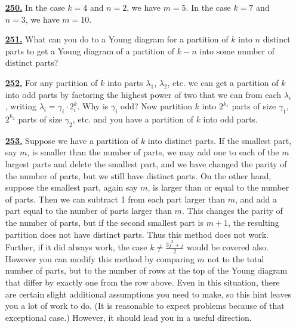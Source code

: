 \documentclass[10pt,]{book}
\theoremstyle{plain}
\theoremstyle{definition}
\theoremstyle{definition}
\theoremstyle{definition}
\numberwithin{equation}{chapter}
\begin{document}
\begin{itemize}[itemsep=1em]
\hypertarget{a-250}{}\item[\textbf{\hyperref[activity-250]{250.}}]
\hypertarget{p-1137}{}%
In the case \(k=4\) and \(n=2\), we have \(m=5\). In the case \(k = 7\) and \(n = 3\), we have \(m = 10\).%

\hypertarget{a-251}{}\item[\textbf{\hyperref[activity-251]{251.}}]
\hypertarget{p-1140}{}%
What can you do to a Young diagram for a partition of \(k\) into \(n\) distinct parts to get a Young diagram of a partition of \(k-n\) into some number of distinct parts?%

\hypertarget{a-252}{}\item[\textbf{\hyperref[activity-252]{252.}}]
\hypertarget{p-1143}{}%
For any partition of \(k\) into parts \(\lambda_1\), \(\lambda_2\), etc. we can get a partition of \(k\) into odd parts by factoring the highest power of two that we can from each \(\lambda_i\), writing \(\lambda_i = \gamma_i\cdot 2^k_i\).  Why is \(\gamma_i\) odd? Now partition \(k\) into \(2^{k_1}\) parts of size \(\gamma_1\), \(2^{k_2}\) parts of size \(\gamma_2\), etc. and you have a partition of \(k\) into odd parts.%

\hypertarget{a-253}{}\item[\textbf{\hyperref[activity-253]{253.}}]
\hypertarget{p-1147}{}%
Suppose we have a partition of \(k\) into distinct parts. If the smallest part, say \(m\), is smaller than the number of parts, we may add one to each of the \(m\) largest parts and delete the smallest part, and we have changed the parity of the number of parts, but we still have distinct parts. On the other hand, suppose the smallest part, again say \(m\), is larger than or equal to the number of parts. Then we can subtract 1 from each part larger than \(m\), and add a part equal to the number of parts larger than \(m\). This changes the parity of the number of parts, but if the second smallest part is \(m+1\), the resulting partition does not have distinct parts. Thus this method does not work. Further, if it did always work, the case \(k \ne \frac{3j^2+j}{2}\) would be covered also. However you can modify this method by comparing \(m\) not to the total number of parts, but to the number of rows at the top of the Young diagram that differ by exactly one from the row above. Even in this situation, there are certain slight additional assumptions you need to make, so this hint leaves you a lot of work to do. (It is reasonable to expect problems because of that exceptional case.) However, it should lead you in a useful direction.%


\end{itemize}
\end{document}
